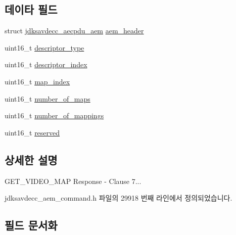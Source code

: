 \subsection*{데이타 필드}
\begin{DoxyCompactItemize}
\item 
struct \hyperlink{structjdksavdecc__aecpdu__aem}{jdksavdecc\+\_\+aecpdu\+\_\+aem} \hyperlink{structjdksavdecc__aem__command__get__video__map__response_ae1e77ccb75ff5021ad923221eab38294}{aem\+\_\+header}
\item 
uint16\+\_\+t \hyperlink{structjdksavdecc__aem__command__get__video__map__response_ab7c32b6c7131c13d4ea3b7ee2f09b78d}{descriptor\+\_\+type}
\item 
uint16\+\_\+t \hyperlink{structjdksavdecc__aem__command__get__video__map__response_a042bbc76d835b82d27c1932431ee38d4}{descriptor\+\_\+index}
\item 
uint16\+\_\+t \hyperlink{structjdksavdecc__aem__command__get__video__map__response_a3a5e0547986898ad64c07f238d8b7bcf}{map\+\_\+index}
\item 
uint16\+\_\+t \hyperlink{structjdksavdecc__aem__command__get__video__map__response_a6d00316ed943197ab46c0af22c1d430a}{number\+\_\+of\+\_\+maps}
\item 
uint16\+\_\+t \hyperlink{structjdksavdecc__aem__command__get__video__map__response_ac7db472c5622ef473d5d0a5c416d5531}{number\+\_\+of\+\_\+mappings}
\item 
uint16\+\_\+t \hyperlink{structjdksavdecc__aem__command__get__video__map__response_a5a6ed8c04a3db86066924b1a1bf4dad3}{reserved}
\end{DoxyCompactItemize}


\subsection{상세한 설명}
G\+E\+T\+\_\+\+V\+I\+D\+E\+O\+\_\+\+M\+AP Response -\/ Clause 7... 

jdksavdecc\+\_\+aem\+\_\+command.\+h 파일의 29918 번째 라인에서 정의되었습니다.



\subsection{필드 문서화}
